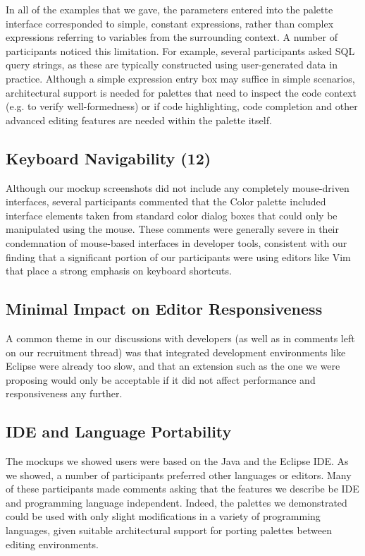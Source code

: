 \documentclass[10pt, conference, compsocconf]{IEEEtran}
\begin{document}
In all of the examples that we gave, the parameters entered into the palette interface corresponded to simple, constant expressions, rather than complex expressions referring to variables from the surrounding context. A number of participants noticed this limitation. For example, several participants asked SQL query strings, as these are typically constructed using user-generated data in practice. Although a simple expression entry box may suffice in simple scenarios, architectural support is needed for palettes that need to inspect the code context (e.g. to verify well-formedness) or if code highlighting, code completion and other advanced editing features are needed within the palette itself.

\subsection{Keyboard Navigability (12)}

Although our mockup screenshots did not include any completely mouse-driven interfaces, several participants commented that the Color palette included interface elements taken from standard color dialog boxes that could only be manipulated using the mouse. These comments were generally severe in their condemnation of mouse-based interfaces in developer tools, consistent with our finding that a significant portion of our participants were using editors like Vim that place a strong emphasis on keyboard shortcuts.

\subsection{Minimal Impact on Editor Responsiveness}

A common theme in our discussions with developers (as well as in comments left on our recruitment thread) was that integrated development environments like Eclipse were already too slow, and that an extension such as the one we were proposing would only be acceptable if it did not affect performance and responsiveness any further.

\subsection{IDE and Language Portability}

The mockups we showed users were based on the Java and the Eclipse IDE. As we showed, a number of participants preferred other languages or editors. Many of these participants made comments asking that the features we describe be IDE and programming language independent. Indeed, the palettes we demonstrated could be used with only slight modifications in a variety of programming languages, given suitable architectural support for porting palettes between editing environments.
\end{document}
